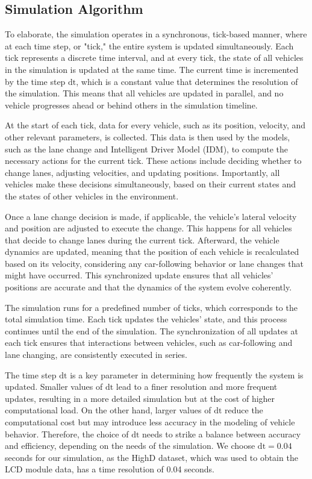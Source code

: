 \subsection{Simulation Algorithm}

To elaborate, the simulation operates in a synchronous, tick-based manner, where at each time step, or "tick," the entire system is updated simultaneously. Each tick represents a discrete time interval, and at every tick, the state of all vehicles in the simulation is updated at the same time. The current time is incremented by the time step $\text{dt}$, which is a constant value that determines the resolution of the simulation. This means that all vehicles are updated in parallel, and no vehicle progresses ahead or behind others in the simulation timeline.

At the start of each tick, data for every vehicle, such as its position, velocity, and other relevant parameters, is collected. This data is then used by the models, such as the lane change and Intelligent Driver Model (IDM), to compute the necessary actions for the current tick. These actions include deciding whether to change lanes, adjusting velocities, and updating positions. Importantly, all vehicles make these decisions simultaneously, based on their current states and the states of other vehicles in the environment.


Once a lane change decision is made, if applicable, the vehicle's lateral velocity and position are adjusted to execute the change. This happens for all vehicles that decide to change lanes during the current tick. Afterward, the vehicle dynamics are updated, meaning that the position of each vehicle is recalculated based on its velocity, considering any car-following behavior or lane changes that might have occurred. This synchronized update ensures that all vehicles' positions are accurate and that the dynamics of the system evolve coherently.

The simulation runs for a predefined number of ticks, which corresponds to the total simulation time. Each tick updates the vehicles' state, and this process continues until the end of the simulation. The synchronization of all updates at each tick ensures that interactions between vehicles, such as car-following and lane changing, are consistently executed in series.



The time step $\text{dt}$ is a key parameter in determining how frequently the system is updated. Smaller values of $\text{dt}$ lead to a finer resolution and more frequent updates, resulting in a more detailed simulation but at the cost of higher computational load. On the other hand, larger values of $\text{dt}$ reduce the computational cost but may introduce less accuracy in the modeling of vehicle behavior. Therefore, the choice of $\text{dt}$ needs to strike a balance between accuracy and efficiency, depending on the needs of the simulation. We choose $\text{dt} = 0.04$ seconds for our simulation, as the HighD dataset, which was used to obtain the LCD module data, has a time resolution of 0.04 seconds.



